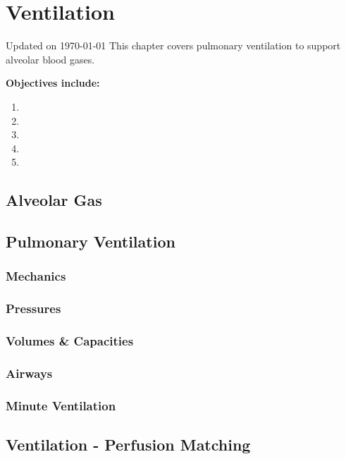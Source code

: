\chapter{Ventilation}\label{chp:alveolar_oxygen}
Updated on \today
\minitoc
This chapter covers pulmonary ventilation to support alveolar blood gases.

\vspace{5mm}

\textbf{Objectives include:}
\begin{enumerate}
    \item
    \item
    \item
    \item
    \item
\end{enumerate}

\section{Alveolar Gas}

\section{Pulmonary Ventilation}

\subsection{Mechanics}

\subsection{Pressures}

\subsection{Volumes \& Capacities}

\subsection{Airways}

\subsection{Minute Ventilation}

\section{Ventilation - Perfusion Matching}

